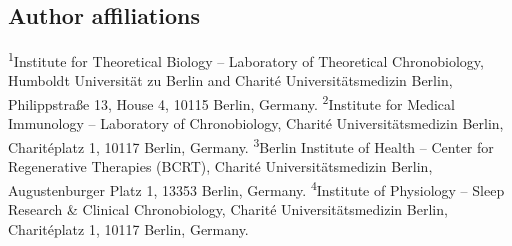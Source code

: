 \subsection*{Author affiliations}
\textsuperscript{1}Institute for Theoretical Biology -- Laboratory of Theoretical Chronobiology, Humboldt Universit\"at zu Berlin and Charit\'e Universit\"atsmedizin Berlin, Philippstra\ss e 13, House 4, 10115 Berlin, Germany. \textsuperscript{2}Institute for Medical Immunology -- Laboratory of Chronobiology, Charité Universitätsmedizin Berlin, Charitéplatz 1, 10117 Berlin, Germany. \textsuperscript{3}Berlin Institute of Health -- Center for Regenerative Therapies (BCRT), Charit\'e Universit\"atsmedizin Berlin, Augustenburger Platz 1,
13353 Berlin, Germany. \textsuperscript{4}Institute of Physiology -- Sleep Research \& Clinical Chronobiology, Charit\'e Universit\"atsmedizin Berlin, Charit\'eplatz 1, 10117 Berlin, Germany.